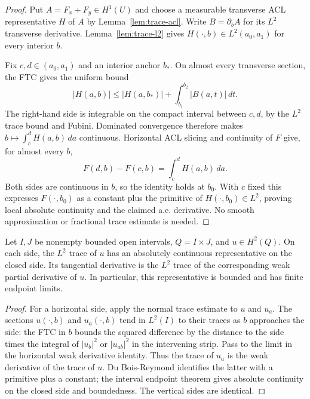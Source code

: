 \begin{proof}
\leanok
Put $A=F_x+F_y\in H^1(U)$ and choose a measurable transverse ACL
representative $H$ of $A$ by Lemma~\ref{lem:trace-acl}. Write $B=\partial_bA$
for its $L^2$ transverse derivative. Lemma~\ref{lem:trace-l2} gives
$H(\cdot,b)\in L^2(a_0,a_1)$ for every interior $b$.

Fix $c,d\in(a_0,a_1)$ and an interior anchor $b_*$. On almost every
transverse section, the FTC gives the uniform bound
\[
  |H(a,b)|\le |H(a,b_*)|+\int_{b_1}^{b_2}|B(a,t)|\,dt .
\]
The right-hand side is integrable on the compact interval between $c,d$,
by the $L^2$ trace bound and Fubini. Dominated convergence therefore makes
$b\mapsto\int_c^d H(a,b)\,da$ continuous. Horizontal ACL slicing and
continuity of $F$ give, for almost every $b$,
\[
  F(d,b)-F(c,b)=\int_c^d H(a,b)\,da .
\]
Both sides are continuous in $b$, so the identity holds at $b_0$.
With $c$ fixed this expresses $F(\cdot,b_0)$ as a constant plus the
primitive of $H(\cdot,b_0)\in L^2$, proving local absolute continuity and
the claimed a.e. derivative. No smooth approximation or fractional
trace estimate is needed.
\end{proof}

\begin{lemma}
\label{lem:trace-h2-boundary}
\leanok
Let $I,J$ be nonempty bounded open intervals, $Q=I\times J$, and
$u\in H^2(Q)$.
On each side, the $L^2$ trace of $u$ has an absolutely continuous
representative on the closed side. Its tangential derivative is the
$L^2$ trace of the corresponding weak partial derivative of $u$.
In particular, this representative is bounded and has finite endpoint
limits.
\end{lemma}

\begin{proof}
\leanok
For a horizontal side, apply the normal trace estimate to $u$ and
$u_a$. The sections $u(\cdot,b)$ and $u_a(\cdot,b)$ tend in $L^2(I)$
to their traces as $b$ approaches the side: the FTC in $b$ bounds the
squared difference by the distance to the side times the integral of
$|u_b|^2$ or $|u_{ab}|^2$ in the intervening strip.
Pass to the limit in the horizontal weak derivative identity.
Thus the trace of $u_a$ is the weak derivative of the trace of $u$.
Du Bois-Reymond identifies the latter with a primitive plus a constant;
the interval endpoint theorem gives absolute continuity on the closed
side and boundedness. The vertical sides are identical.
\end{proof}

